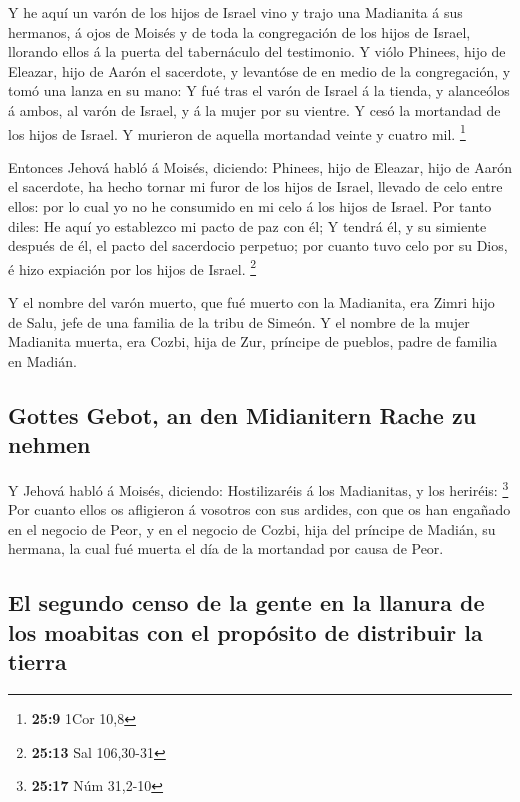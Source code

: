  Y he aquí un varón de los hijos de Israel vino y trajo una
Madianita á sus hermanos, á ojos de Moisés y de toda la congregación de
los hijos de Israel, llorando ellos á la puerta del tabernáculo del
testimonio.  Y viólo Phinees, hijo de Eleazar, hijo de Aarón
el sacerdote, y levantóse de en medio de la congregación, y tomó una
lanza en su mano:  Y fué tras el varón de Israel á la
tienda, y alanceólos á ambos, al varón de Israel, y á la mujer por su
vientre. Y cesó la mortandad de los hijos de Israel.  Y
murieron de aquella mortandad veinte y cuatro mil. \footnote{\textbf{25:9}
  1Cor 10,8}

 Entonces Jehová habló á Moisés, diciendo: 
Phinees, hijo de Eleazar, hijo de Aarón el sacerdote, ha hecho tornar mi
furor de los hijos de Israel, llevado de celo entre ellos: por lo cual
yo no he consumido en mi celo á los hijos de Israel.  Por
tanto diles: He aquí yo establezco mi pacto de paz con él; 
Y tendrá él, y su simiente después de él, el pacto del sacerdocio
perpetuo; por cuanto tuvo celo por su Dios, é hizo expiación por los
hijos de Israel. \footnote{\textbf{25:13} Sal 106,30-31}

 Y el nombre del varón muerto, que fué muerto con la
Madianita, era Zimri hijo de Salu, jefe de una familia de la tribu de
Simeón.  Y el nombre de la mujer Madianita muerta, era
Cozbi, hija de Zur, príncipe de pueblos, padre de familia en Madián.

\hypertarget{gottes-gebot-an-den-midianitern-rache-zu-nehmen}{%
\subsection{Gottes Gebot, an den Midianitern Rache zu
nehmen}\label{gottes-gebot-an-den-midianitern-rache-zu-nehmen}}

 Y Jehová habló á Moisés, diciendo: 
Hostilizaréis á los Madianitas, y los heriréis: \footnote{\textbf{25:17}
  Núm 31,2-10}  Por cuanto ellos os afligieron á vosotros
con sus ardides, con que os han engañado en el negocio de Peor, y en el
negocio de Cozbi, hija del príncipe de Madián, su hermana, la cual fué
muerta el día de la mortandad por causa de Peor.

\hypertarget{el-segundo-censo-de-la-gente-en-la-llanura-de-los-moabitas-con-el-propuxf3sito-de-distribuir-la-tierra}{%
\subsection{El segundo censo de la gente en la llanura de los moabitas
con el propósito de distribuir la
tierra}\label{el-segundo-censo-de-la-gente-en-la-llanura-de-los-moabitas-con-el-propuxf3sito-de-distribuir-la-tierra}}

